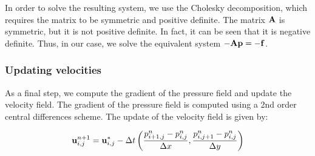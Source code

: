 In order to solve the resulting system, we use the Cholesky decomposition, which requires the matrix to be symmetric and positive definite. The matrix $\boldsymbol{\mathrm{A}}$ is symmetric, but it is not positive definite. In fact, it can be seen that it is negative definite. Thus, in our case, we solve the equivalent system $-\boldsymbol{\mathrm{A}} \boldsymbol{\mathrm{p}} = -\boldsymbol{\mathrm{f}}$.


\subsubsection*{Updating velocities}

As a final step, we compute the gradient of the pressure field and update the velocity field. The gradient of the pressure field is computed using a 2nd order central differences scheme. The update of the velocity field is given by:

\begin{equation*}
  \boldsymbol{\mathrm{u}}_{i,j}^{n+1} = \boldsymbol{\mathrm{u}}_{i,j}^* - \Delta t \left(
  \frac{p_{i+1,j}^{n} - p_{i,j}^{n}}{\Delta x}, \frac{p_{i,j+1}^{n} - p_{i,j}^{n}}{\Delta y}
  \right)
\end{equation*}
